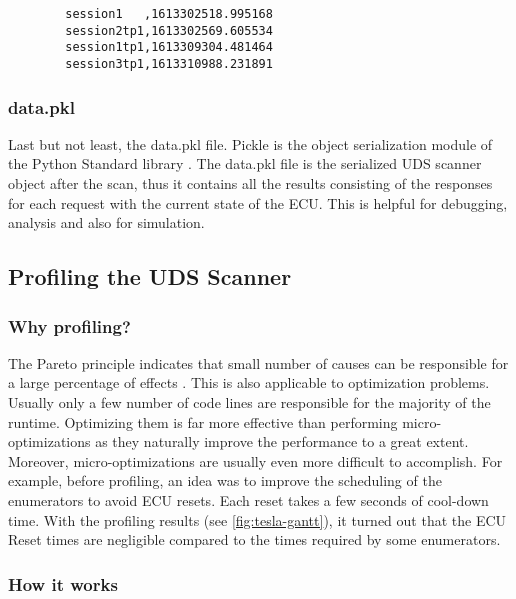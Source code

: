 \begin{samepage}
    \begin{verbatim}
        session1   ,1613302518.995168
        session2tp1,1613302569.605534
        session1tp1,1613309304.481464
        session3tp1,1613310988.231891
    \end{verbatim}
\end{samepage}

\subsubsection{data.pkl}

Last but not least, the data.pkl file. Pickle is the object serialization module of the Python Standard library \cite{pickle}. The data.pkl file is the serialized UDS scanner object after the scan, thus it contains all the results consisting of the responses for each request with the current state of the ECU. This is helpful for debugging, analysis and also for simulation.


\subsection{Profiling the UDS Scanner}

\subsubsection{Why profiling?}

The Pareto principle indicates that small number of causes can be responsible for a large percentage of effects \cite{pareto}. This is also applicable to optimization problems. Usually only a few number of code lines are responsible for the majority of the runtime. Optimizing them is far more effective than performing micro-optimizations as they naturally improve the performance to a great extent. Moreover, micro-optimizations are usually even more difficult to accomplish. For example, before profiling, an idea was to improve the scheduling of the enumerators to avoid ECU resets. Each reset takes a few seconds of cool-down time. With the profiling results (see \autoref{fig:tesla-gantt}), it turned out that the ECU Reset times are negligible compared to the times required by some enumerators.

\subsubsection{How it works}


